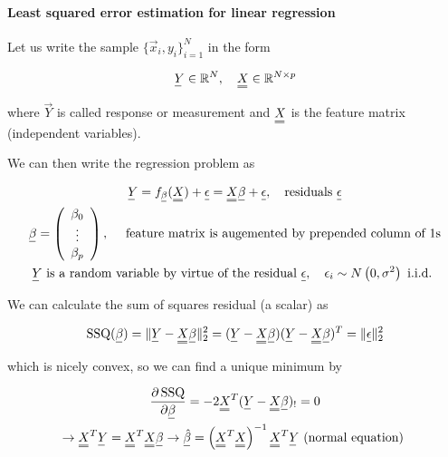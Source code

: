 \paragraph*{Least squared error estimation for linear regression} Let us write the sample $\{ \vec{x}_i,y_i \}_{i=1}^N$ in the form

\begin{equation}
    \vec{Y} \in \mathbb{R}^N, \quad \mat{X} \in \mathbb{R}^{N\times p}
\end{equation}

where $\vec{Y}$ is called response or measurement and $\mat{X}$ is the feature matrix (independent variables).

We can then write the regression problem as

\begin{equation}
    \begin{gathered}
        \vec{Y} = f_\vec{\beta}(\mat{X}) + \vec{\epsilon} = \mat{X}\vec{\beta} + \vec{\epsilon}, \quad \text{residuals } \vec{\epsilon} \\
        \vec{\beta}=\left(\begin{array}{c}
            \beta_0 \\
            \vdots \\
            \beta_p
            \end{array}\right), \quad \text { feature matrix is augemented by prepended column of } 1 \text{s} \\
            \vec{Y} \text { is a random variable by virtue of the residual } \vec{\epsilon}, \quad \epsilon_i \sim N\left(0, \sigma^2\right) \text { i.i.d. }
    \end{gathered}
\end{equation}

We can calculate the sum of squares residual (a scalar) as

\begin{equation}
    \operatorname{SSQ}(\vec{\beta})=\|\vec{Y}-\mat{X} \vec{\beta}\|_2^2=(\vec{Y}-\mat{X} \vec{\beta})(\vec{Y}-\mat{X} \vec{\beta})^T=\|\vec{\epsilon}\|_2^2
\end{equation}

which is nicely convex, so we can find a unique minimum by

\begin{equation}
    \begin{gathered}
    \frac{\partial \operatorname{SSQ}}{\partial \vec{\beta}}=-2 \mat{X}^T(\vec{Y}-\mat{X} \vec{\beta})_{!}=0 \\
    \rightarrow \mat{X}^T \vec{Y}=\mat{X}^T \mat{X} \vec{\beta} \rightarrow \vec{\hat{\beta}}=\left(\mat{X}^T \mat{X}\right)^{-1} \mat{X}^T \vec{Y} \text { (normal equation) }
    \end{gathered}
\end{equation}

